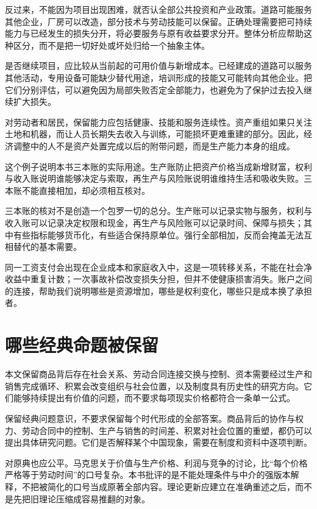 \documentclass[UTF8,fontset=fandol,zihao=-4,oneside,openany]{ctexbook}
\begin{document}
反过来，不能因为项目出现困难，就否认全部公共投资和产业政策。道路可能服务其他企业，厂房可以改造，部分技术与劳动技能可以保留。正确处理需要把可持续能力与已经发生的损失分开，将必要服务与原有收益要求分开。整体分析应帮助这种区分，而不是把一切好处或坏处归给一个抽象主体。

\label{arg:P283}
是否继续项目，应比较从当前起的可用价值与新增成本。已经建成的道路可以服务其他活动，专用设备可能缺少替代用途，培训形成的技能又可能转向其他企业。把它们分别评估，可以避免因为局部失败否定全部能力，也避免为了保护过去投入继续扩大损失。

对劳动者和居民，保留能力应包括健康、技能和服务连续性。资产重组如果只关注土地和机器，而让人员长期失去收入与训练，可能损坏更难重建的部分。因此，经济调整中的人不是资产处置完成以后的附带问题，而是生产能力本身的组成。

这个例子说明本书三本账的实际用途。生产账防止把资产价格当成新增财富，权利与收入账说明谁能够决定与索取，再生产与风险账说明谁维持生活和吸收失败。三本账不能直接相加，却必须相互核对。

\label{arg:P284}
三本账的核对不是创造一个包罗一切的总分。生产账可以记录实物与服务，权利与收入账可以记录决定权限和现金，再生产与风险账可以记录时间、保障与损失；其中有些指标能够货币化，有些适合保持原单位。强行全部相加，反而会掩盖无法互相替代的基本需要。

同一工资支付会出现在企业成本和家庭收入中，这是一项转移关系，不能在社会净收益中重复计数；一次事故补偿改变损失分担，但并不使健康损害消失。账户之间的连接，帮助我们说明哪些是资源增加，哪些是权利变化，哪些只是成本换了承担者。

\section*{哪些经典命题被保留}
本文保留商品背后存在社会关系、劳动合同连接交换与控制、资本需要经过生产和销售完成循环、积累会改变组织与社会位置，以及制度具有历史性的研究方向。它们能够持续提出有价值的问题，而不要求每项现实价格都符合一条单一公式。

\label{arg:P285}
保留经典问题意识，不要求保留每个时代形成的全部答案。商品背后的协作与权力、劳动合同中的控制、生产与销售的时间差、积累对社会位置的重塑，都仍可以提出具体研究问题。它们是否解释某个中国现象，需要在制度和资料中逐项判断。

对原典也应公平。马克思关于价值与生产价格、利润与竞争的讨论，比“每个价格严格等于劳动时间”的口号复杂。本书批评的是不能处理条件与中介的强版本解释，不把被简化的口号当成原著全部内容。理论更新应建立在准确重述之后，而不是先把旧理论压缩成容易推翻的对象。
\end{document}
